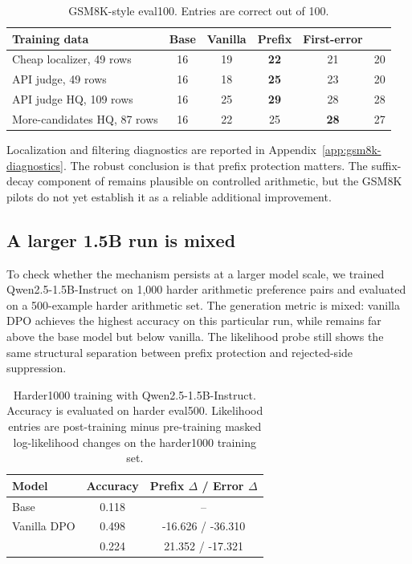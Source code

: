 \begin{table}[t]
\caption{GSM8K-style eval100. Entries are correct out of 100.}
\label{tab:gsm8k-pilots}
\begin{center}
\begin{tabular}{lccccc}
\toprule
Training data & Base & Vanilla & Prefix & First-error & \cmdpo{} \\
\midrule
Cheap localizer, 49 rows & 16 & 19 & \textbf{22} & 21 & 20 \\
API judge, 49 rows & 16 & 18 & \textbf{25} & 23 & 20 \\
API judge HQ, 109 rows & 16 & 25 & \textbf{29} & 28 & 28 \\
More-candidates HQ, 87 rows & 16 & 22 & 25 & \textbf{28} & 27 \\
\bottomrule
\end{tabular}
\end{center}
\end{table}

Localization and filtering diagnostics are reported in Appendix~\ref{app:gsm8k-diagnostics}. The robust conclusion is that prefix protection matters. The suffix-decay component of \cmdpo{} remains plausible on controlled arithmetic, but the GSM8K pilots do not yet establish it as a reliable additional improvement.

\subsection{A larger 1.5B run is mixed}

To check whether the mechanism persists at a larger model scale, we trained Qwen2.5-1.5B-Instruct on 1,000 harder arithmetic preference pairs and evaluated on a 500-example harder arithmetic set. The generation metric is mixed: vanilla DPO achieves the highest accuracy on this particular run, while \cmdpo{} remains far above the base model but below vanilla. The likelihood probe still shows the same structural separation between prefix protection and rejected-side suppression.

\begin{table}[t]
\caption{Harder1000 training with Qwen2.5-1.5B-Instruct. Accuracy is evaluated on harder eval500. Likelihood entries are post-training minus pre-training masked log-likelihood changes on the harder1000 training set.}
\label{tab:qwen15b}
\begin{center}
\begin{tabular}{lcc}
\toprule
Model & Accuracy & Prefix $\Delta$ / Error $\Delta$ \\
\midrule
Base & 0.118 & -- \\
Vanilla DPO & 0.498 & -16.626 / -36.310 \\
\cmdpo{} & 0.224 & 21.352 / -17.321 \\
\bottomrule
\end{tabular}
\end{center}
\end{table}

